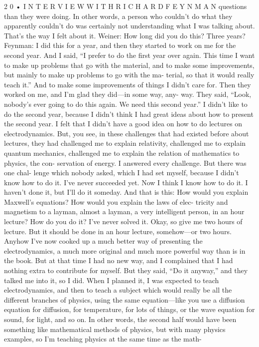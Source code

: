 \documentclass[10pt,oneside]{article}
\begin{document}
2 0 • I N T E R V I E W  W I T H  R I C H A R D  F E Y N M A N questions than they were doing. In other words, a person who couldn’t do what they apparently couldn’t do was certainly not understanding what I was talking about. That’s the way I felt about it. Weiner: How long did you do this? Three years? Feynman: I did this for a year, and then they started to work on me for the second year. And I said, “I prefer to do the first year over again. This time I want to make up problems that go with the material, and to make some improvements, but mainly to make up problems to go with the ma- terial, so that it would really teach it.” And to make some improvements of things I didn’t care for. Then they worked on me, and I’m glad they did---in some way, any- way. They said, “Look, nobody’s ever going to do this again. We need this second year.” I didn’t like to do the second year, because I didn’t think I had great ideas about how to present the second year. I felt that I didn’t have a good idea on how to do lectures on electrodynamics. But, you see, in these challenges that had existed before about lectures, they had challenged me to explain relativity, challenged me to explain quantum mechanics, challenged me to explain the relation of mathematics to physics, the con- servation of energy. I answered every challenge. But there was one chal- lenge which nobody asked, which I had set myself, because I didn’t know how to do it. I’ve never succeeded yet. Now I think I know how to do it. I haven’t done it, but I’ll do it someday. And that is this: How would you explain Maxwell’s equations? How would you explain the laws of elec- tricity and magnetism to a layman, almost a layman, a very intelligent person, in an hour lecture? How do you do it? I’ve never solved it. Okay, so give me two hours of lecture. But it should be done in an hour lecture, somehow---or two hours. Anyhow I’ve now cooked up a much better way of presenting the electrodynamics, a much more original and much more powerful way than is in the book. But at that time I had no new way, and I complained that I had nothing extra to contribute for myself. But they said, “Do it anyway,” and they talked me into it, so I did. When I planned it, I was expected to teach electrodynamics, and then to teach a subject which would really be all the different branches of physics, using the same equation---like you use a diffusion equation for diffusion, for temperature, for lots of things, or the wave equation for sound, for light, and so on. In other words, the second half would have been something like mathematical methods of physics, but with many physics examples, so I’m teaching physics at the same time as the math-\par
\end{document}
